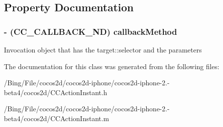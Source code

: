 \subsection{Property Documentation}
\hypertarget{interface_c_c_call_func_n_d_aac7c0913e85a9a4046d36e960bee2ec2}{
\subsubsection[{callback\-Method}]{\setlength{\rightskip}{0pt plus 5cm}-\/ (C\-C\-\_\-\-C\-A\-L\-L\-B\-A\-C\-K\-\_\-\-N\-D) {\bf callback\-Method}}}\label{interface_c_c_call_func_n_d_aac7c0913e85a9a4046d36e960bee2ec2}
Invocation object that has the target\-::selector and the parameters 

The documentation for this class was generated from the following files\-:\begin{DoxyCompactItemize}
\item 
/\-Bing/\-File/cocos2d/cocos2d-\/iphone/cocos2d-\/iphone-\/2.-\/beta4/cocos2d/C\-C\-Action\-Instant.\-h\item 
/\-Bing/\-File/cocos2d/cocos2d-\/iphone/cocos2d-\/iphone-\/2.-\/beta4/cocos2d/C\-C\-Action\-Instant.\-m\end{DoxyCompactItemize}
